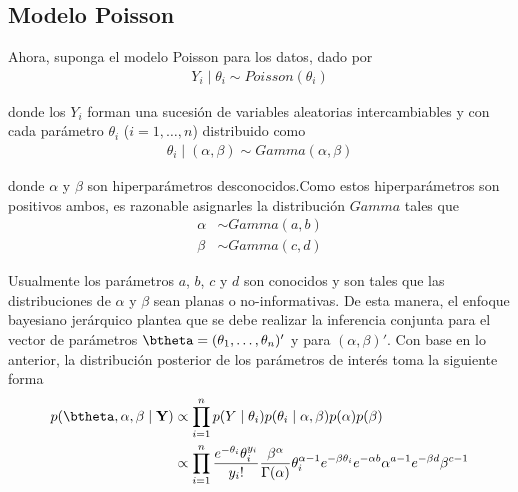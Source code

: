 \begin{knitrout}
\end{knitrout}



\subsection{Modelo Poisson}
Ahora, suponga el modelo Poisson para los datos, dado por 
\begin{align*}
Y_i \mid \theta_i \sim Poisson(\theta_i)
\end{align*}

donde los $Y_i$ forman una sucesión de variables aleatorias intercambiables y con cada parámetro $\theta_i$ ($i=1,\ldots,n$) distribuido como
\begin{align*}
\theta_i \mid (\alpha,\beta) \sim Gamma(\alpha,\beta)
\end{align*}

donde $\alpha$ y $\beta$ son hiperparámetros desconocidos.Como estos hiperparámetros son positivos ambos, es razonable asignarles la distribución $Gamma$ tales que
\begin{align*}
\alpha &\sim Gamma(a,b)\\
\beta &\sim Gamma(c,d)
\end{align*}

Usualmente los parámetros $a$, $b$, $c$ y $d$ son conocidos y son tales que las distribuciones de $\alpha$ y $\beta$ sean planas o no-informativas. De esta manera, el enfoque bayesiano jerárquico plantea que se debe realizar la inferencia conjunta para el vector de parámetros $\btheta=(\theta_1, \ldots, \theta_n)'$ y para $(\alpha, \beta)'$. Con base en lo anterior, la distribución posterior de los parámetros de interés toma la siguiente forma
\begin{align*}
p(\btheta,\alpha,\beta \mid \mathbf{Y})&\propto
\prod_{i=1}^n p(Y\mid \theta_i)p(\theta_i\mid \alpha, \beta)p(\alpha)p(\beta)\\
&\propto \prod_{i=1}^n \frac{e^{-\theta_i}\theta_i^{y_i}}{y_i!}
\frac{\beta^\alpha}{\Gamma(\alpha)}\theta_i^{\alpha-1}e^{-\beta\theta_i}
e^{-\alpha b}\alpha^{a-1}e^{-\beta d}\beta^{c-1}
\end{align*}

